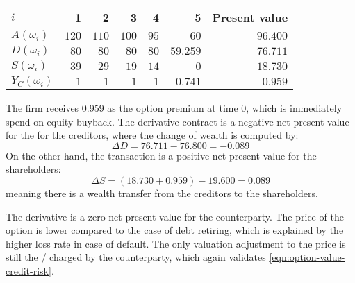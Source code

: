 \documentclass[../main.tex]{subfiles}
\begin{document}
            \begin{table}[h]
                \centering
                \begin{tabular}{l|rrrrr||r}
                    $i$ & 1 & 2 & 3 & 4 & 5 & Present value \\
                    \hline
                    $A(\omega_{i})$ & $120$ & $110$ & $100$ & $95$ & $60$ & $96.400$ \\
                    $D(\omega_{i})$ & $80$ & $80$ & $80$ & $80$ & $59.259$ & $76.711$ \\
                    $S(\omega_{i})$ & $39$ & $29$ & $19$ & $14$ & $0$ & $18.730$ \\
                    $Y_C(\omega_{i})$ & $1$ & $1$ & $1$ & $1$ & $0.741$ & $0.959$ \\
                \end{tabular}
                \caption{}
                \label{tbl:example-equity-buyback}
            \end{table}

            The firm receives 0.959 as the option premium at time 0, which is immediately spend on equity buyback. 
            The derivative contract is a negative net present value for the for the creditors, 
            where the change of wealth is computed by:
            \begin{equation}
                \Delta D = 76.711 - 76.800 = -0.089
            \end{equation}
            On the other hand, the transaction is a positive net present value for the shareholders:
            \begin{equation}
                \Delta S = (18.730 + 0.959) - 19.600 = 0.089
            \end{equation}
            meaning there is a wealth transfer from the creditors to the shareholders.

            The derivative is a zero net present value for the counterparty. 
            The price of the option is lower compared to the case of debt retiring, 
            which is explained by the higher loss rate in case of default. 
            The only valuation adjustment to the price is still the \CVA/ charged by the counterparty, 
            which again validates \cref{eqn:option-value-credit-risk}.
\end{document}
